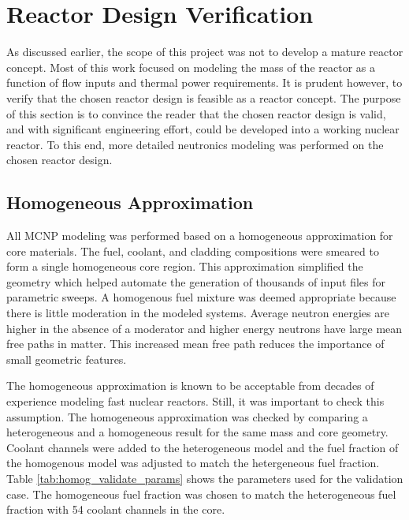 \chapter{Reactor Design Verification}
    As discussed earlier, the scope of this project was not to develop a mature
reactor concept. Most of this work focused on modeling the mass of the
reactor as a function of flow inputs and thermal power requirements. It is
prudent however, to verify that the chosen reactor design is feasible as a
reactor concept. The purpose of this section is to convince the reader that
the chosen reactor design is valid, and with significant engineering effort,
could be developed into a working nuclear reactor. To this end, more detailed
neutronics modeling was performed on the chosen reactor design.

\section{Homogeneous Approximation}
All MCNP modeling was performed based on a homogeneous approximation for core
materials. The fuel, coolant, and cladding compositions were smeared to form a
single homogeneous core region. This approximation simplified the geometry which
helped automate the generation of thousands of input files for parametric
sweeps. A homogenous fuel mixture was deemed appropriate because there is little
moderation in the modeled systems. Average neutron energies are higher in the
absence of a moderator and higher energy neutrons have large mean free paths in
matter. This increased mean free path reduces the importance of small geometric
features.

The homogeneous approximation is known to be acceptable from decades of
experience modeling fast nuclear reactors. Still, it was important to check
this assumption. The homogeneous approximation was checked by comparing a
heterogeneous and a homogeneous \keff result for the same \uran mass and core
geometry. Coolant channels were added to the heterogeneous model and the fuel
fraction of the homogenous model was adjusted to match the hetergeneous fuel
fraction. Table \ref{tab:homog_validate_params} shows the parameters used for
the validation case. The homogeneous fuel fraction was chosen to match the
heterogeneous fuel fraction with 54 coolant channels in the core.

